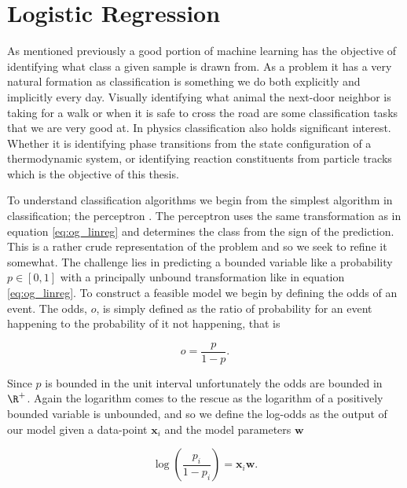 
\section{Logistic Regression}\label{sec:LogReg}

As mentioned previously a good portion of machine learning has the objective of identifying what class a given sample is drawn from. As a problem it has a very natural formation as classification is something we do both explicitly and implicitly every day. Visually identifying what animal the next-door neighbor is taking for a walk or when it is safe to cross the road are some classification tasks that we are very good at. In physics classification also holds significant interest. Whether it is identifying phase transitions from the state configuration of a thermodynamic system, or identifying reaction constituents from particle tracks which is the objective of this thesis.

To understand classification algorithms we begin from the simplest algorithm in classification; the perceptron \cite{Rosenblatt1958}. The perceptron uses the same transformation as in equation \ref{eq:og_linreg} and determines the class from the sign of the prediction. This is a rather crude representation of the problem and so we seek to refine it somewhat. The challenge lies in predicting a bounded variable like a probability $p \in [0,1]$ with a principally unbound transformation like in equation \ref{eq:og_linreg}. To construct a feasible model we begin by defining the odds of an event. The odds, $o$, is simply defined as the ratio of probability for an event happening to the probability of it not happening, that is 

\begin{equation}\label{eq:odds}
o = \frac{p}{1-p}.
\end{equation}

\noindent Since $p$ is bounded in the unit interval unfortunately the odds are bounded in $\R^+$. Again the logarithm comes to the rescue as the logarithm of a positively bounded variable is unbounded, and so we define the log-odds as the output of our model given a data-point $\boldsymbol{x}_i$ and the model parameters $\boldsymbol{w}$

\begin{equation}\label{eq:log_odds}
\log \left(\frac{p_i}{1-p_i}\right) = \boldsymbol{x}_i\boldsymbol{w}. 
\end{equation} 

